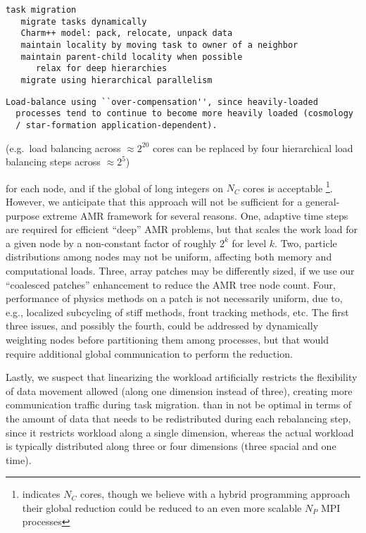 \documentclass[10pt]{article}
\begin{document}
\begin{verbatim}
task migration
   migrate tasks dynamically
   Charm++ model: pack, relocate, unpack data
   maintain locality by moving task to owner of a neighbor
   maintain parent-child locality when possible
      relax for deep hierarchies
   migrate using hierarchical parallelism
\end{verbatim}
\begin{verbatim}
Load-balance using ``over-compensation'', since heavily-loaded
  processes tend to continue to become more heavily loaded (cosmology
  / star-formation application-dependent).
\end{verbatim}

(e.g.~load balancing
across $\approx 2^20$ cores can be replaced by four hierarchical
load balancing steps across $\approx 2^5$)


for each node, and if the global  of long
integers on $N_C$ cores is acceptable \footnote{\cite{BuGh08}
  indicates $N_C$ cores, though we believe with a hybrid programming
  approach their global reduction could be reduced to an even more
  scalable $N_P$ MPI processes}.  However, we anticipate that this
approach will not be sufficient for a general-purpose extreme AMR
framework for several reasons.
%
One, adaptive time steps are required for efficient ``deep'' AMR
problems, but that scales the work load for a given node by a
non-constant factor of roughly $2^k$ for level $k$.
%
Two, particle distributions among nodes may not be uniform, affecting both memory and computational loads.
%
Three, array patches may be differently sized, if we use our ``coalesced patches'' enhancement to reduce the AMR tree node count.  
%
Four, performance of physics methods on a patch is not necessarily
uniform, due to, e.g., localized subcycling of stiff methods, front
tracking methods, etc.  The first three issues, and possibly the
fourth, could be addressed by dynamically weighting nodes before
partitioning them among processes, but that would require additional
global communication to perform the reduction.
%

Lastly, we suspect that linearizing the workload artificially
restricts the flexibility of data movement allowed (along one
dimension instead of three), creating more communication traffic
during task migration.  than in not be optimal in terms of the amount
of data that needs to be redistributed during each rebalancing step,
since it restricts workload along a single dimension, whereas the
actual workload is typically distributed along three or four
dimensions (three spacial and one time).
\end{document}

